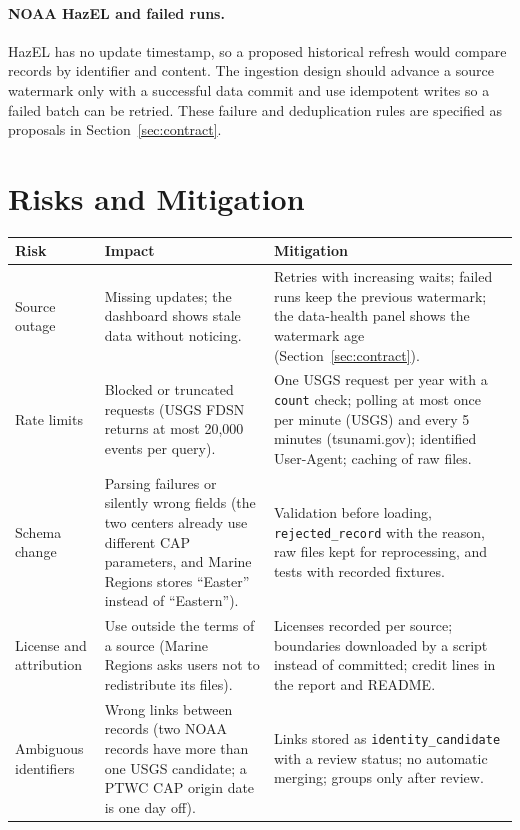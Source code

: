 \documentclass[a4paper,11pt,oneside]{book}
\begin{document}
\paragraph{NOAA HazEL and failed runs.}
HazEL has no update timestamp, so a proposed historical refresh would
compare records by identifier and content. The ingestion design should
advance a source watermark only with a successful data commit and use
idempotent writes so a failed batch can be retried. These failure and
deduplication rules are specified as proposals in Section~\ref{sec:contract}.

\section{Risks and Mitigation}
\begin{table}[H]
\centering
\small
\begin{tabularx}{\textwidth}{@{}>{\raggedright\arraybackslash}p{2.6cm}>{\raggedright\arraybackslash}X>{\raggedright\arraybackslash}X@{}}
\toprule
Risk & Impact & Mitigation \\
\midrule
Source outage & Missing updates; the dashboard shows stale data without noticing. & Retries with increasing waits; failed runs keep the previous watermark; the data-health panel shows the watermark age (Section~\ref{sec:contract}). \\
Rate limits & Blocked or truncated requests (USGS FDSN returns at most 20,000 events per query). & One USGS request per year with a \texttt{count} check; polling at most once per minute (USGS) and every 5 minutes (tsunami.gov); identified User-Agent; caching of raw files. \\
Schema change & Parsing failures or silently wrong fields (the two centers already use different CAP parameters, and Marine Regions stores ``Easter'' instead of ``Eastern''). & Validation before loading, \texttt{rejected\_record} with the reason, raw files kept for reprocessing, and tests with recorded fixtures. \\
License and attribution & Use outside the terms of a source (Marine Regions asks users not to redistribute its files). & Licenses recorded per source; boundaries downloaded by a script instead of committed; credit lines in the report and README. \\
Ambiguous identifiers & Wrong links between records (two NOAA records have more than one USGS candidate; a PTWC CAP origin date is one day off). & Links stored as \texttt{identity\_candidate} with a review status; no automatic merging; groups only after review. \\

\end{tabularx}
\end{table}
\end{document}
